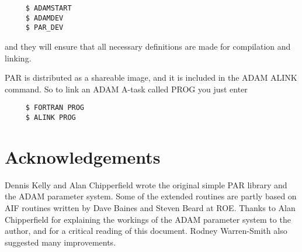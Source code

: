 \documentclass[twoside,11pt]{article}
\newcommand{\xlabel}[1]{}
\begin{document}
\begin{verbatim}
     $ ADAMSTART
     $ ADAMDEV
     $ PAR_DEV
\end{verbatim}

and they will ensure that all necessary definitions are made for
compilation and linking. 

PAR is distributed as a shareable image, and it is included in the
{\footnotesize ADAM} ALINK command.  So to link an {\footnotesize ADAM}
A-task called PROG you just enter

\begin{verbatim}
     $ FORTRAN PROG
     $ ALINK PROG
\end{verbatim}

\section{\xlabel{acknowledgements}Acknowledgements}

Dennis Kelly and Alan Chipperfield wrote the original simple PAR library
and the {\footnotesize ADAM} parameter system.  Some of the extended
routines are partly based on AIF routines written by Dave Baines and
Steven Beard at ROE.  Thanks to Alan Chipperfield for explaining the
workings of the {\footnotesize ADAM} parameter system to the author, and
for a critical reading of this document.  Rodney Warren-Smith also
suggested many improvements. 

\newpage
\appendix
\small
\end{document}
